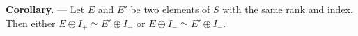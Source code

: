 \textbf{Corollary.} — Let $E$ and $E'$ be two elements of $S$ with the same rank and index. Then either $E \oplus I_+ \simeq E' \oplus I_+$ or $E \oplus I_- \simeq E' \oplus I_-$.
